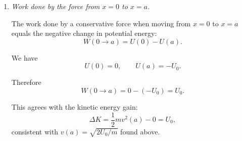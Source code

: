 \documentclass[../main.tex]{subfiles}
\begin{document}
\begin{enumerate}
\begin{enumerate}
    Initially ($x=0$): released from rest $\Rightarrow v=0$,
    \[
    E = K_i + U_i = 0 + U(0) = U(0) = 0.
    \]

    At $x=a$:
    \[
    E = K_f + U(a)
    = \frac{1}{2} m v^2(a) + U(a).
    \]

    Conservation $E_i=E_f$:
    \[
    0
    = \frac{1}{2} m v^2(a) + U(a).
    \]

    We already have
    \[
    U(a) = -U_0.
    \]

    So
    \[
    0
    = \frac{1}{2} m v^2(a) - U_0
    \quad\Longrightarrow\quad
    \frac{1}{2} m v^2(a) = U_0.
    \]

    Solve for $v(a)$:
    \[
    v(a) = \sqrt{\frac{2U_0}{m}}.
    \]

    Note: the particle moves from an unstable equilibrium at $x=0$ down to a stable equilibrium at $x=a$, losing potential energy (from $0$ to $-U_0$) and gaining kinetic energy.

    \item \textit{Work done by the force from $x=0$ to $x=a$.}

    The work done by a conservative force when moving from $x=0$ to $x=a$ equals the negative change in potential energy:
    \[
    W(0 \to a) = U(0) - U(a).
    \]

    We have
    \[
    U(0) = 0,
    \qquad
    U(a) = -U_0.
    \]

    Therefore
    \[
    W(0 \to a)
    = 0 - (-U_0)
    = U_0.
    \]

    This agrees with the kinetic energy gain:
    \[
    \Delta K = \frac{1}{2}m v^2(a) - 0 = U_0,
    \]
    consistent with $v(a)=\sqrt{2U_0/m}$ found above.
\end{enumerate}

\end{enumerate}
\end{document}
